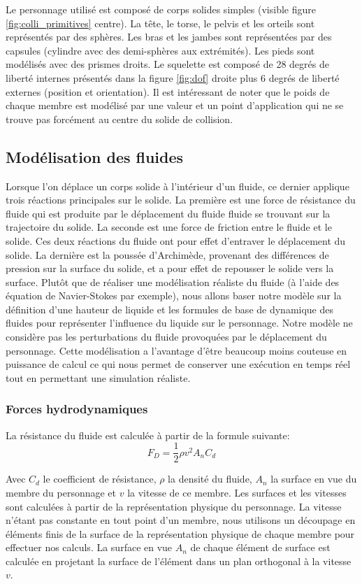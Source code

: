 \documentclass[runningheads,a4paper]{llncs}
\begin{document}
Le personnage utilisé est composé de corps solides simples (visible figure \ref{fig:colli_primitives} centre). La tête, le torse, le pelvis et les orteils sont représentés par des sphères. Les bras et les jambes sont représentées par des capsules (cylindre avec des demi-sphères aux extrémités). Les pieds sont modélisés avec des prismes droits. Le squelette est composé de 28 degrés de liberté internes présentés dans la figure \ref{fig:dof} droite plus 6 degrés de liberté externes (position et orientation). Il est intéressant de noter que le poids de chaque membre est modélisé par une valeur et un point d'application qui ne se trouve pas forcément au centre du solide de collision.

%
\subsection{Modélisation des fluides}
%
\label{sec:model_fluide}
Lorsque l'on déplace un corps solide à l'intérieur d'un fluide, ce dernier applique trois réactions principales sur le solide. La première est une force de résistance du fluide qui est produite par le déplacement du fluide fluide se trouvant sur la trajectoire du solide. La seconde est une force de friction entre le fluide et le solide. Ces deux réactions du fluide ont pour effet d'entraver le déplacement du solide. La dernière est la poussée d'Archimède, provenant des différences de pression sur la surface du solide, et a pour effet de repousser le solide vers la surface.
Plutôt que de réaliser une modélisation réaliste du fluide (à l'aide des équation de Navier-Stokes par exemple), nous allons baser notre modèle sur la définition d'une hauteur de liquide et les formules de base de dynamique des fluides pour représenter l'influence du liquide sur le personnage. Notre modèle ne considère pas les perturbations du fluide provoquées par le déplacement du personnage. Cette modélisation a l'avantage d'être beaucoup moins couteuse en puissance de calcul ce qui nous permet de conserver une exécution en temps réel tout en permettant une simulation réaliste.
%
\subsubsection{Forces hydrodynamiques}
%
La résistance du fluide est calculée à partir de la formule suivante:
\[
F_D=\frac{1}{2} \rho v^2 A_n C_d
\]


Avec \(C_d\) le coefficient de résistance, \(\rho\) la densité du fluide, \(A_n\) la surface en vue du membre du personnage et \(v\) la vitesse de ce membre. Les surfaces et les vitesses sont calculées à partir de la représentation physique du personnage. La vitesse n'étant pas constante en tout point d'un membre, nous utilisons un découpage en éléments finis de la surface de la représentation physique de chaque membre pour effectuer nos calculs. La surface en vue $A_n$ de chaque élément de surface est calculée en projetant la surface de l'élément dans un plan orthogonal à la vitesse $v$. 
\end{document}
